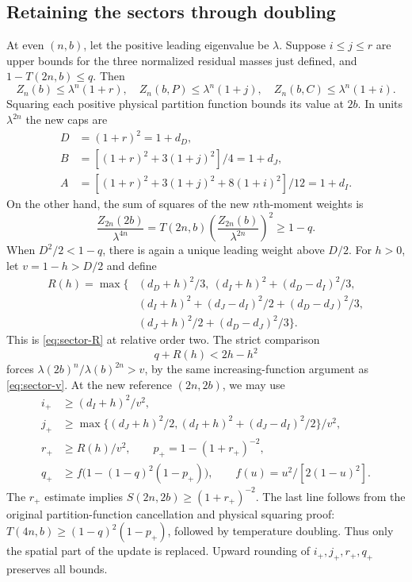 \documentclass[11pt,a4paper]{article}
\begin{document}
\subsection{Retaining the sectors through doubling}
At even $(n,b)$, let the positive leading eigenvalue be $\lambda$.
Suppose $i\le j\le r$ are upper bounds for the three normalized residual
masses just defined, and $1-T(2n,b)\le q$. Then
\[
 Z_n(b)\le\lambda^n(1+r),\quad
 Z_n(b,P)\le\lambda^n(1+j),\quad
 Z_n(b,C)\le\lambda^n(1+i).
\]
Squaring each positive physical partition function bounds its value
at $2b$. In units $\lambda^{2n}$ the new caps are
\begin{align*}
 D&=(1+r)^2=1+d_D,\\
 B&=[(1+r)^2+3(1+j)^2]/4=1+d_J,\\
 A&=[(1+r)^2+3(1+j)^2+8(1+i)^2]/12=1+d_I.
\end{align*}
On the other hand, the sum of squares of the new $n$th-moment weights is
\[
 \frac{Z_{2n}(2b)}{\lambda^{4n}}
 =T(2n,b)\left(\frac{Z_{2n}(b)}{\lambda^{2n}}\right)^2
 \ge1-q.
\]
When $D^2/2<1-q$, there is again a unique leading weight above $D/2$.
For $h>0$, let $v=1-h>D/2$ and define
\begin{align*}
 R(h)=\max\{& (d_D+h)^2/3,\ (d_I+h)^2+(d_D-d_I)^2/3,\\
            & (d_I+h)^2+(d_J-d_I)^2/2+(d_D-d_J)^2/3,\\
            & (d_J+h)^2/2+(d_D-d_J)^2/3\}.
\end{align*}
This is \eqref{eq:sector-R} at relative order two. The strict comparison
\begin{equation}\label{eq:sector-h}
 q+R(h)<2h-h^2
\end{equation}
forces $\lambda(2b)^n/\lambda(b)^{2n}>v$, by the same increasing-function
argument as \eqref{eq:sector-v}. At the new reference $(2n,2b)$, we may use
\begin{align*}
 i_+&\ge(d_I+h)^2/v^2,\\
 j_+&\ge\max\{(d_J+h)^2/2,(d_I+h)^2+(d_J-d_I)^2/2\}/v^2,\\
 r_+&\ge R(h)/v^2,\qquad p_+=1-(1+r_+)^{-2},\\
 q_+&\ge f\bigl(1-(1-q)^2(1-p_+)\bigr),\qquad
 f(u)=u^2/[2(1-u)^2].
\end{align*}
The $r_+$ estimate implies $S(2n,2b)\ge(1+r_+)^{-2}$.
The last line follows from the original partition-function cancellation
and physical squaring proof: $T(4n,b)\ge(1-q)^2(1-p_+)$, followed by
temperature doubling. Thus only the spatial part of the update is
replaced. Upward rounding of $i_+,j_+,r_+,q_+$ preserves all bounds.
\end{document}
